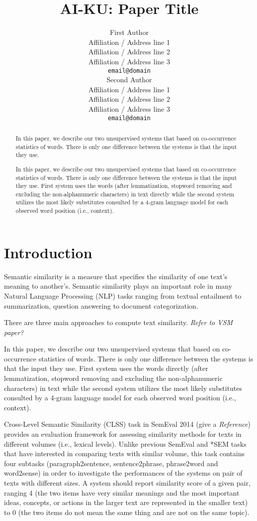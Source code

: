 \documentclass[11pt]{article}
\title{AI-KU: Paper Title}
\author{First Author \\
  Affiliation / Address line 1 \\
  Affiliation / Address line 2 \\
  Affiliation / Address line 3 \\
  {\tt email@domain} \\\And
  Second Author \\
  Affiliation / Address line 1 \\
  Affiliation / Address line 2 \\
  Affiliation / Address line 3 \\
  {\tt email@domain} \\}
\date{}
\begin{document}
\maketitle
\begin{abstract}

In this paper, we describe our two unsupervised systems that based on co-occurrence statistics of words. There is only one difference between the systems is that the input they use. 

In this paper, we describe our two unsupervised systems that based on co-occurrence statistics of words. There is only one difference between the systems is that the input they use. First system uses the words (after lemmatization, stopword removing and excluding the non-alphanumeric characters) in text directly while the second system utilizes the most likely substitutes consulted by a 4-gram language model for each observed word position (i.e., context).

\end{abstract}

\section{Introduction}
\label{intro}

Semantic similarity is a measure that specifies the similarity of one text's meaning to another's. Semantic similarity plays an important role in many Natural Language Processing (NLP) tasks ranging from textual entailment to summarization, question answering to document categorization. 

There are three main approaches to compute text similarity. \emph{Refer to VSM paper?}

In this paper, we describe our two unsupervised systems that based on co-occurrence statistics of words. There is only one difference between the systems is that the input they use. First system uses the words directly (after lemmatization, stopword removing and excluding the non-alphanumeric characters) in text while the second system utilizes the most likely substitutes consulted by a 4-gram language model for each observed word position (i.e., context).

Cross-Level Semantic Similarity (CLSS) task in SemEval 2014 (give a \emph{Reference}) provides an evaluation framework for assessing similarity methods for texts in different volumes (i.e., lexical levels). Unlike previous SemEval and *SEM tasks that have interested in comparing texts with similar volume, this task contains four subtasks (paragraph2sentence, sentence2phrase, phrase2word and word2sense) in order to investigate the performances of the systems on pair of texts with different sizes. A system should report similarity score of a given pair, ranging 4 (the two items have very similar meanings and the most important ideas, concepts, or actions in the larger text are represented in the smaller text) to 0 (the two items do not mean the same thing and are not on the same topic).
\end{document}
